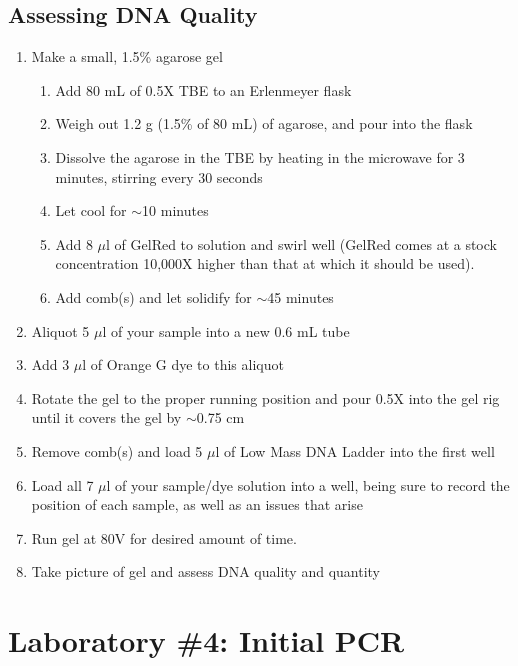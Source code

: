 \documentclass[12pt, hidelinks]{article}
\begin{document}
	\subsection{Assessing DNA Quality}
		\begin{enumerate}
			\item Make a small, 1.5\% agarose gel
				\begin{enumerate}
					\item Add 80 mL of 0.5X TBE to an Erlenmeyer flask
					\item Weigh out 1.2 g (1.5\% of 80 mL) of agarose, and pour into the flask
					\item Dissolve the agarose in the TBE by heating in the microwave for 3 minutes, stirring every 30 seconds
					\item Let cool for $\sim$10 minutes
					\item Add 8 $\mu$l of GelRed to solution and swirl well (GelRed comes at a stock concentration 10,000X higher than that at which it should be used).
					\item Add comb(s) and let solidify for $\sim$45 minutes
				\end{enumerate}
			\item Aliquot 5 $\mu$l of your sample into a new 0.6 mL tube
			\item Add 3 $\mu$l of Orange G dye to this aliquot
			\item Rotate the gel to the proper running position and pour 0.5X into the gel rig until it covers the gel by $\sim$0.75 cm
			\item Remove comb(s) and load 5 $\mu$l of Low Mass DNA Ladder into the first well
			\item Load all 7 $\mu$l of your sample/dye solution into a well, being sure to record the position of each sample, as well as an issues that arise
			\item Run gel at 80V for desired amount of time.
			\item Take picture of gel and assess DNA quality and quantity
		\end{enumerate}		


\newpage
\section{Laboratory \#4: Initial PCR}
\end{document}
